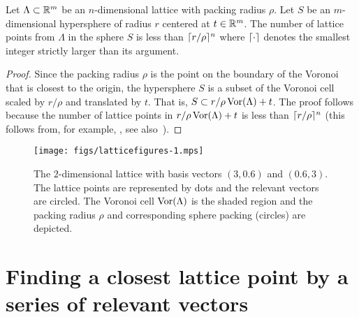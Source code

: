 \documentclass[final,leqno]{siamltex}
\begin{document}
\begin{proposition}\label{eq:latticepointsinsphere}
Let $\Lambda \subset {\mathbb R}^{m}$ be an $n$-dimensional lattice with packing radius $\rho$.  Let $S$ be an $m$-dimensional hypersphere of radius $r$ centered at $t \in {\mathbb R}^{m}$.  The number of lattice points from $\Lambda$ in the sphere $S$ is less than $\lceil r/\rho \rceil^{n}$ where $\lceil \cdot \rceil$ denotes the smallest integer strictly larger than its argument. 
 \end{proposition}
 \begin{proof}
Since the packing radius $\rho$ is the point on the boundary of the Voronoi that is closest to the origin, the hypersphere $S$ is a subset of the Voronoi cell scaled by $r/\rho$ and translated by $t$.  That is, $S \subset r/\rho \operatorname{Vor}(\Lambda) + t$.  The proof follows because the number of lattice points in $r/\rho \operatorname{Vor}(\Lambda) + t$ is less than $\lceil r/\rho \rceil^n$ (this follows from, for example, \cite[Theorem~2]{ConwaySloane1992_voronoi_lattice_3d_obtuse_superbases}, see also~\cite[Lemma~3.7]{Micciancio09adeterministic}).
\end{proof}
 

 
\begin{figure}[tp] 
	\centering      
		\texttt{[image: figs/latticefigures-1.mps]} 
		\caption{The $2$-dimensional lattice with basis vectors $(3,0.6)$ and $(0.6,3)$.  The lattice points are represented by dots and the relevant vectors are circled.  The Voronoi cell $\operatorname{Vor}(\Lambda)$ is the shaded region and the packing radius $\rho$ and corresponding sphere packing (circles) are depicted.
}     
		\label{lattices:fig:vorregion}   
\end{figure} 



\section{Finding a closest lattice point by a series of relevant vectors} \label{sec:iterative-slicer}
\end{document}
